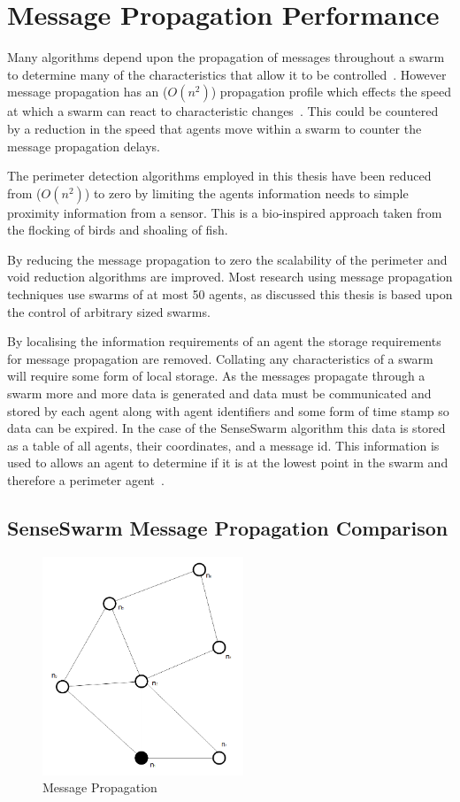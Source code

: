 \section{Message Propagation Performance\label{methods:MessagePropogation}}
Many algorithms depend upon the propagation of messages throughout a swarm to determine many of the characteristics that allow it to be controlled~\cite{MD:09}. However message propagation has an ($O(n^2)$) propagation profile which effects the speed at which a swarm can react to characteristic changes~\cite{SHA:07}. This could be countered by a reduction in the speed that agents move within a swarm to counter the message propagation delays. 

The perimeter detection algorithms employed in this thesis have been reduced from ($O(n^2)$) to zero by limiting the agents information needs to simple proximity information from a sensor. This is a bio-inspired approach taken from the flocking of birds and shoaling of fish.

By reducing the message propagation to zero the scalability of the perimeter and void reduction algorithms are improved. Most research using message propagation techniques use swarms of at most 50 agents, as discussed this thesis is based upon the control of arbitrary sized swarms.

By localising the information requirements of an agent the storage requirements for message propagation are removed. Collating any characteristics of a swarm will require some form of local storage. As the messages propagate through a swarm more and more data is generated and data must be communicated and stored by each agent along with agent identifiers and some form of time stamp so data can be expired. In the case of the SenseSwarm algorithm this data is stored as a table of all agents, their coordinates, and a message id. This information is used to allows an agent to determine if it is at the lowest point in the swarm and therefore a perimeter agent~\cite{ZAPS:07}.

\subsection{SenseSwarm Message Propagation Comparison}
\begin{figure}[H]
\begin{center}
\includegraphics[width=6cm]{CHAPTER-6/figures/MessagePropogation1}
\end{center}
\caption{Message Propagation \label{methods:MessagePropogation1}}
\end{figure}

